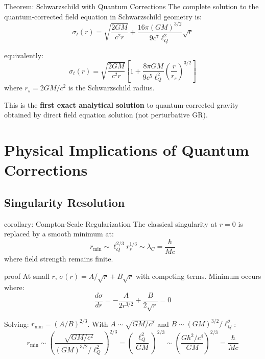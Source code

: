 \documentclass[11pt,a4paper]{article}
\theoremstyle{definition}
\theoremstyle{remark}
\begin{document}
	Theorem: Schwarzschild with Quantum Corrections
		The complete solution to the quantum-corrected field equation in Schwarzschild geometry is:
		\begin{equation}\label{eq:complete_schwarzschild}
			\boxed{\sigma_t(r) = \sqrt{\frac{2GM}{c^2r}} + \frac{16\pi(GM)^{3/2}}{9c^7\ell_Q^2}\sqrt{r}}
		\end{equation}
		
		equivalently:
		\begin{equation}
			\boxed{\sigma_t(r) = \sqrt{\frac{2GM}{c^2r}}\left[1 + \frac{8\pi GM}{9c^5\ell_Q^2}\left(\frac{r}{r_s}\right)^{3/2}\right]}
		\end{equation}
		where $r_s = 2GM/c^2$ is the Schwarzschild radius.
	
	This is the \textbf{first exact analytical solution} to quantum-corrected gravity obtained by direct field equation solution (not perturbative GR).
	
	\section{Physical Implications of Quantum Corrections}
	
	\subsection{Singularity Resolution}
	
	corollary: Compton-Scale Regularization
		The classical singularity at $r = 0$ is replaced by a smooth minimum at:
		\begin{equation}
			r_{\min} \sim \ell_Q^{2/3}r_s^{1/3} \sim \lambda_C = \frac{\hbar}{Mc}
		\end{equation}
		where field strength remains finite.
	
	proof
		At small $r$, $\sigma(r) = A/\sqrt{r} + B\sqrt{r}$ with competing terms. Minimum occurs where:
		\begin{equation}
			\frac{d\sigma}{dr} = -\frac{A}{2r^{3/2}} + \frac{B}{2\sqrt{r}} = 0
		\end{equation}
		
		Solving: $r_{\min} = (A/B)^{2/3}$. With $A \sim \sqrt{GM/c^2}$ and $B \sim (GM)^{3/2}/\ell_Q^2$:
		\begin{equation}
			r_{\min} \sim \left(\frac{\sqrt{GM/c^2}}{(GM)^{3/2}/\ell_Q^2}\right)^{2/3} = \left(\frac{\ell_Q^2}{GM}\right)^{2/3} \sim \left(\frac{G\hbar^2/c^4}{GM}\right)^{2/3} = \frac{\hbar}{Mc}
		\end{equation}
	
\end{document}

